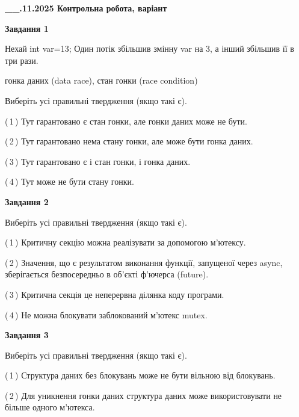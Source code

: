 \documentclass[12pt, ukrainian]{article}
\begin{document}
\begin {large}

\textbf{\_\_.11.2025 Контрольна робота, варіант  }\par


{

\begin{center}
\textbf{Завдання 1}
\end{center}
Нехай int var=13; Один потік збільшив змінну var на 3, а інший збільшив її в три рази.

гонка даних (data race), стан гонки (race condition)

Виберіть усі правильні твердження (якщо такі є).\par
\vspace{2mm}
(\,1\,) Тут гарантовано є стан гонки, але гонки даних може не бути.%

(\,2\,) Тут гарантовано нема стану гонки, але може бути гонка даних.%

(\,3\,) Тут гарантовано є і стан гонки, і гонка даних.%

(\,4\,) Тут може не бути стану гонки.%



\begin{center}
\textbf{Завдання 2}
\end{center}
Виберіть усі правильні твердження (якщо такі є).\par
\vspace{2mm}

(\,1\,) Критичну секцію можна реалізувати за допомогою м’ютексу.%

(\,2\,) Значення, що є результатом виконання функції, запущеної через async, зберігається безпосередньо в об’єкті ф’ючерса (future).%

(\,3\,) Критична секція це неперервна ділянка коду програми.%

(\,4\,) Не можна блокувати заблокований м’ютекс mutex.%



\begin{center}
\textbf{Завдання 3}
\end{center}
Виберіть усі правильні твердження (якщо такі є).\par
\vspace{2mm}

(\,1\,) Структура даних без блокувань може не бути вільною від блокувань.%

(\,2\,) Для уникнення гонки даних структура даних може використовувати не більше одного м’ютекса.%

}
\end{large}
\end{document}
